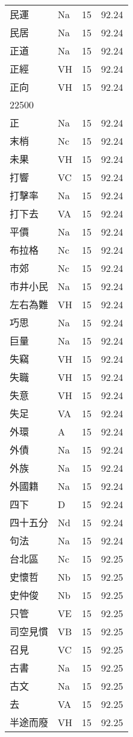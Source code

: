 \documentclass[twocolumn]{book}
\begin{document}
\begin{supertabular}{llrr}
民運 & Na & 15 &  92.24\\
民居 & Na & 15 &  92.24\\
正道 & Na & 15 &  92.24\\
正經 & VH & 15 &  92.24\\
正向 & VH & 15 &  92.24\\
22500\\
正 & Na & 15 &  92.24\\
末梢 & Nc & 15 &  92.24\\
未果 & VH & 15 &  92.24\\
打響 & VC & 15 &  92.24\\
打擊率 & Na & 15 &  92.24\\
打下去 & VA & 15 &  92.24\\
平價 & Na & 15 &  92.24\\
布拉格 & Nc & 15 &  92.24\\
市郊 & Nc & 15 &  92.24\\
市井小民 & Na & 15 &  92.24\\
左右為難 & VH & 15 &  92.24\\
巧思 & Na & 15 &  92.24\\
巨量 & Na & 15 &  92.24\\
失竊 & VH & 15 &  92.24\\
失職 & VH & 15 &  92.24\\
失意 & VH & 15 &  92.24\\
失足 & VA & 15 &  92.24\\
外環 & A & 15 &  92.24\\
外債 & Na & 15 &  92.24\\
外族 & Na & 15 &  92.24\\
外國籍 & Na & 15 &  92.24\\
四下 & D & 15 &  92.24\\
四十五分 & Nd & 15 &  92.24\\
句法 & Na & 15 &  92.24\\
台北區 & Nc & 15 &  92.25\\
史懷哲 & Nb & 15 &  92.25\\
史仲俊 & Nb & 15 &  92.25\\
只管 & VE & 15 &  92.25\\
司空見慣 & VB & 15 &  92.25\\
召見 & VC & 15 &  92.25\\
古書 & Na & 15 &  92.25\\
古文 & Na & 15 &  92.25\\
去 & VA & 15 &  92.25\\
半途而廢 & VH & 15 &  92.25\\

\end{supertabular}
\end{document}
